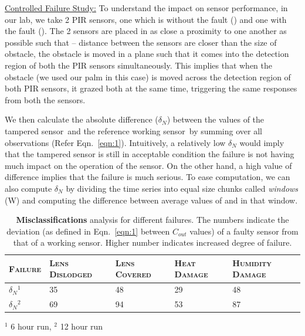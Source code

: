 
\noindent \underline{Controlled Failure Study:} To understand the impact on sensor performance, in our lab, we take 2 PIR sensors, one which is without the fault (\working) and one with the fault (\tampered). The 2 sensors are placed in as close a proximity to one another as possible such that -- \ca distance between the sensors are closer than the size of obstacle, \cb the obstacle is moved in a plane such that it comes into the detection region of both the PIR sensors simultaneously. This implies that when the obstacle (we used our palm in this case) is moved across the detection region of both PIR sensors, it grazed both at the same time, triggering the same responses from both the sensors.

We then calculate the absolute difference ($\delta_N$) between the \cout values of the tampered sensor~\viz  \couttampered and the reference working sensor~\viz \coutworking by summing over all observations (Refer Eqn.~\ref{eqn:1}). Intuitively, a relatively low $\delta_N$ would imply that the tampered sensor is still in acceptable condition \ie the failure is not having much impact on the operation of the sensor. On the other hand, a high value of difference implies that the failure is much serious. To ease computation, we can also compute $\delta_N$ by dividing the time series into equal size chunks called \textit{windows} (W) and computing the difference between average \cout values of \tampered and \working in that window.

\begin{table}%
	\small
	\centering
	\caption{\textbf{Misclassifications} analysis for different failures. The numbers indicate the deviation (as defined in Eqn.~\ref{eqn:1} between $C_{out}$ values) of a faulty sensor from that of a working sensor. Higher number indicates increased degree of failure.}
	\begin{tabular}{lllll}
		\hline
		\bfseries \textsc{Failure} & \bfseries \textsc{Lens Dislodged} & \bfseries \textsc{Lens Covered} & \bfseries \textsc{Heat Damage} & \bfseries \textsc{Humidity Damage}\\
		\hline \hline
		\rowcolor{gray!20} $\delta_N$$^1$ & 35 & 48 & 29 & 48 \\
		$\delta_N$$^2$ & 69 & 94  & 53 & 87 \\
		\hline 
	\end{tabular}
	\label{tbl:fault_degree}
	\quad \raggedright
	$^1$ 6 hour run, $^2$ 12 hour run
\end{table} 

